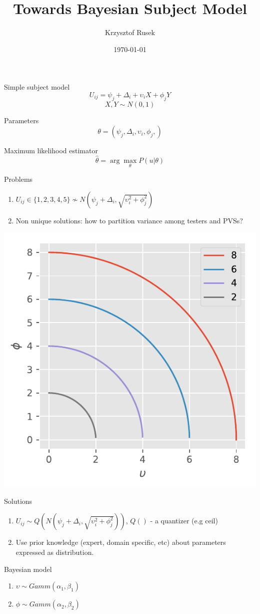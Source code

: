 \documentclass{beamer}
\title{Towards Bayesian Subject Model}
\author{Krzysztof Rusek}
\institute{AGH University of Science and Technology}
\date{\today}
\begin{document}
	
\begin{frame}
\titlepage
\end{frame}


\begin{frame}{Simple subject model }
$$U_{ij}=\psi_{j} + \Delta_i + \upsilon_i X + \phi_{j} Y$$
$$X,Y \sim N(0,1)$$
\begin{block}{Parameters}
	$$\theta = (\psi_{j}, \Delta_i, \upsilon_i ,\phi_j,) $$
\end{block}
\begin{definition}{Maximum likelihood estimator}
	$$\hat \theta = \arg\max_\theta P(u|\theta) $$
\end{definition}

\end{frame}

\begin{frame}{Problems}
\begin{enumerate}
	\item $U_{ij}\in\{1,2,3,4,5\}\nsim N(\psi_{j}+\Delta_i, \sqrt{\upsilon_i^2 +\phi_j^2}) $
	\item Non unique solutions: how to partition variance among testers and PVSs?
\end{enumerate}
\begin{center}
	\includegraphics[width=0.4\linewidth]{izovar}
\end{center}

	
\end{frame}

\begin{frame}{Solutions}
	\begin{enumerate}
		\item $U_{ij} \sim Q(N(\psi_{j}+\Delta_i, \sqrt{\upsilon_i^2 +\phi_j^2}) ) $, $Q()$ - a quantizer (e.g ceil)
		\item Use prior knowledge (expert, domain specific, etc) about parameters expressed as distribution.
	
	\end{enumerate}
\begin{example}{Bayesian model}
	\begin{enumerate}
		\item $\upsilon \sim Gamm(\alpha_1,\beta_1)$
		\item $\phi \sim Gamm(\alpha_2,\beta_2)$
		
	\end{enumerate}
\end{example}
\end{frame}
\end{document}
